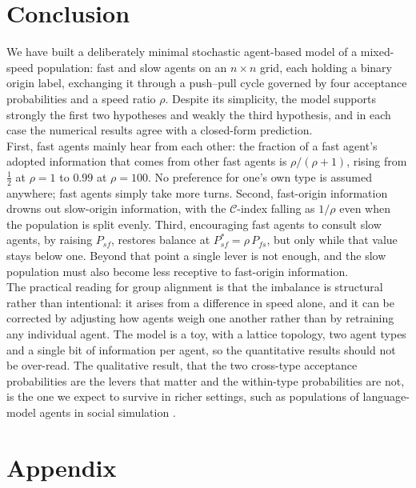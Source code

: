 \documentclass{article}
\newcommand{\Pab}[2]{P_{#1#2}}      %
\newcommand{\Cidx}{\mathcal{C}}      %
\begin{document}
\section{Conclusion}

We have built a deliberately minimal stochastic agent-based model of a mixed-speed population: fast and slow agents on an $n \times n$ grid, each holding a binary origin label, exchanging it through a push--pull cycle governed by four acceptance probabilities and a speed ratio $\rho$. Despite its simplicity, the model supports strongly the first two hypotheses and weakly the third hypothesis, and in each case the numerical results agree with a closed-form prediction. \\

First, fast agents mainly hear from each other: the fraction of a fast agent's adopted information that comes from other fast agents is $\rho/(\rho+1)$, rising from $\tfrac12$ at $\rho = 1$ to $0.99$ at $\rho = 100$. No preference for one's own type is assumed anywhere; fast agents simply take more turns. Second, fast-origin information drowns out slow-origin information, with the $\Cidx$-index falling as $1/\rho$ even when the population is split evenly. Third, encouraging fast agents to consult slow agents, by raising $\Pab{s}{f}$, restores balance at $\Pab{s}{f}^\ast = \rho\,\Pab{f}{s}$, but only while that value stays below one. Beyond that point a single lever is not enough, and the slow population must also become less receptive to fast-origin information. \\

The practical reading for group alignment is that the imbalance is structural rather than intentional: it arises from a difference in speed alone, and it can be corrected by adjusting how agents weigh one another rather than by retraining any individual agent. The model is a toy, with a lattice topology, two agent types and a single bit of information per agent, so the quantitative results should not be over-read. The qualitative result, that the two cross-type acceptance probabilities are the levers that matter and the within-type probabilities are not, is the one we expect to survive in richer settings, such as populations of language-model agents in social simulation \cite{park2023}.



\section{Appendix}
\end{document}
